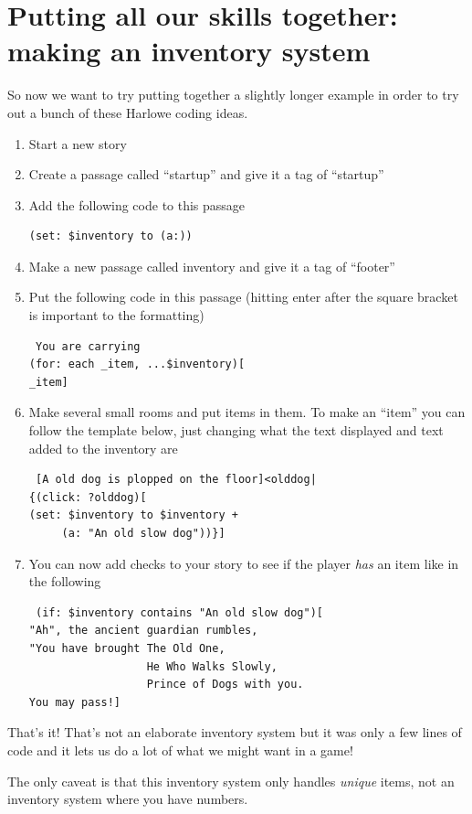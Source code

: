 \documentclass[a5paper,11pt]{article}
\begin{document}
\section{Putting all our skills together: making an inventory system}
So now we want to try putting together a slightly longer example in order to try out a bunch of these Harlowe coding ideas.

\begin{enumerate}
  \item Start a new story
  \item Create a passage called ``startup'' and give it a tag of ``startup''
  \item Add the following code to this passage
\begin{verbatim}
(set: $inventory to (a:))
\end{verbatim}
  \item Make a new passage called inventory and give it a tag of ``footer''
  \item Put the following code in this passage (hitting enter after the square bracket is important to the formatting)
\begin{verbatim}
 You are carrying
(for: each _item, ...$inventory)[
_item]
\end{verbatim}
  \item Make several small rooms and put items in them. To make an ``item'' you can follow the template below, just changing what the text displayed and text added to the inventory are
\begin{verbatim}
 [A old dog is plopped on the floor]<olddog|
{(click: ?olddog)[
(set: $inventory to $inventory + 
     (a: "An old slow dog"))}]
\end{verbatim}
    
  \item You can now add checks to your story to see if the player \emph{has} an item like in the following
\begin{verbatim}
 (if: $inventory contains "An old slow dog")[
"Ah", the ancient guardian rumbles, 
"You have brought The Old One, 
                  He Who Walks Slowly, 
                  Prince of Dogs with you. 
You may pass!]
\end{verbatim}
\end{enumerate}
That's it! That's not an elaborate inventory system but it was only a few lines of code and it lets us do a lot of what we might want in a game!

The only caveat is that this inventory system only handles \textit{unique} items, not an inventory system where you have numbers.
\end{document}
